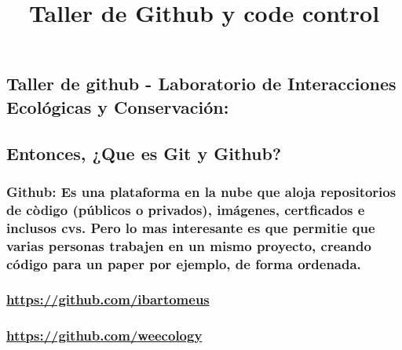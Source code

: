 \documentclass[
]{article}
\title{Taller de Github y code control}
\author{}
\date{\vspace{-2.5em}}
\begin{document}
\maketitle

\subsection{Taller de github - Laboratorio de Interacciones Ecológicas y
Conservación:}\label{taller-de-github---laboratorio-de-interacciones-ecoluxf3gicas-y-conservaciuxf3n}

\subsection{\texorpdfstring{\textbf{Entonces, ¿Que es Git y
Github?}}{Entonces, ¿Que es Git y Github?}}\label{entonces-que-es-git-y-github}

\subsubsection{\texorpdfstring{\textbf{Github}: Es una plataforma en la
nube que aloja repositorios de còdigo (públicos o privados), imágenes,
certficados e inclusos cvs. Pero lo mas interesante es que permitie que
varias personas trabajen en un mismo proyecto, creando código para un
paper por ejemplo, de forma
ordenada.}{Github: Es una plataforma en la nube que aloja repositorios de còdigo (públicos o privados), imágenes, certficados e inclusos cvs. Pero lo mas interesante es que permitie que varias personas trabajen en un mismo proyecto, creando código para un paper por ejemplo, de forma ordenada.}}\label{github-es-una-plataforma-en-la-nube-que-aloja-repositorios-de-cuxf2digo-puxfablicos-o-privados-imuxe1genes-certficados-e-inclusos-cvs.-pero-lo-mas-interesante-es-que-permitie-que-varias-personas-trabajen-en-un-mismo-proyecto-creando-cuxf3digo-para-un-paper-por-ejemplo-de-forma-ordenada.}

\subsubsection{\texorpdfstring{\url{https://github.com/ibartomeus}}{https://github.com/ibartomeus}}\label{httpsgithub.comibartomeus}

\subsubsection{\texorpdfstring{\url{https://github.com/weecology}}{https://github.com/weecology}}\label{httpsgithub.comweecology}
\end{document}
